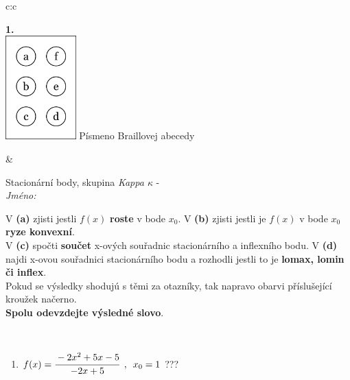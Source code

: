 \documentclass[10pt]{report}
\begin{document}
\begin{tabular}{c:c}
\begin{minipage}[c][104.5mm][t]{0.5\linewidth}
\begin{center}
\begin{minipage}{0.79\linewidth}
\end{minipage}
\begin{minipage}{0.20\linewidth}
\begin{center}
{\Huge\bfseries 1.} \\[2mm]
\includegraphics[height=40mm]{../images/braille.png}
{\small Písmeno Braillovej abecedy}
\end{center}
\end{minipage}
\end{center}
\end{minipage}
&
\begin{minipage}[c][104.5mm][t]{0.5\linewidth}
\begin{center}
\vspace{7mm}
{\huge Stacionární body, skupina \textit{Kappa $\kappa$} -}\\[5mm]
\textit{Jméno:}\phantom{xxxxxxxxxxxxxxxxxxxxxxxxxxxxxxxxxxxxxxxxxxxxxxxxxxxxxxxxxxxxxxxxx}\\[5mm]
\begin{minipage}{0.95\linewidth}
\begin{center}
{\small V \textbf{(a)} zjisti jestli $f(x)$ \textbf{roste} v bode $x_0$. V \textbf{(b)} zjisti jestli je $f(x)$ v bode $x_0$ \textbf{ryze konvexní}.\\V \textbf{(c)} spočti \textbf{součet} x-ových souřadnic stacionárního a inflexního bodu. V \textbf{(d)} najdi x-ovou souřadnici stacionárního bodu a rozhodli jestli to je \textbf{lomax, lomin či inflex}.\\Pokud se výsledky shodujú s těmi za otazníky, tak napravo obarvi příslušející kroužek načerno.\\\textbf{Spolu odevzdejte výsledné slovo}}.
\end{center}
\end{minipage}
\\[1mm]
\begin{minipage}{0.79\linewidth}
\begin{center}
\begin{varwidth}{\linewidth}
\begin{enumerate}
\normalsize
\item $f(x)=\cfrac{-2x^2+5x-5}{-2x+5}\enspace , \enspace x_0=1$\quad \dotfill\; ???\;\dotfill \quad {}

\end{enumerate}
\end{varwidth}
\end{center}
\end{minipage}
\end{center}
\end{minipage}
\end{tabular}
\end{document}
